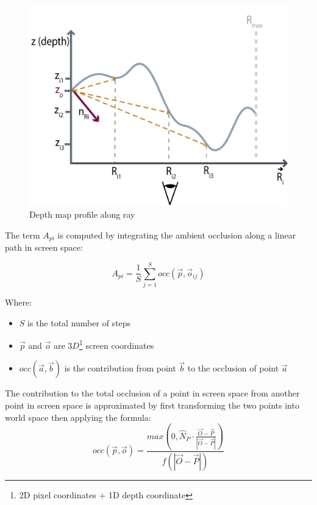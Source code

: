 \documentclass{article}
\begin{document}
\begin{figure}[!ht]
\caption{Depth map profile along ray}
\begin{center}
\includegraphics{images/SSAO-screenspace.png}
\end{center}
\label{ssaocreenspace}
\end{figure}

The term $A_{pi}$ is computed by integrating the ambient occlusion along a linear path
in screen space:

\begin{equation}
A_{pi} = \frac{1}{S}\sum_{j=1}^Socc(\vec{p},\vec{o}_{ij})
\label{ssaoray}
\end{equation}

Where:
\begin{itemize}
	\item $S$ is the total number of steps
	\item $\vec{p}$ and $\vec{o}$ are $3D$\footnote{ 2D pixel coordinates + 1D depth coordinate} screen coordinates
	\item $occ(\vec{a}, \vec{b})$ is the contribution from point $\vec{b}$ to the occlusion
	      of point $\vec{a}$ 
\end{itemize}

The contribution to the total occlusion of a point in screen space from another point in 
screen space is approximated by first transforming the two points into world space then applying the 
formula:
\begin{equation}
occ(\vec{p},\vec{o}) = \frac{max\left( 0, \hat{N}_{P} \cdot \frac{\vec{O}-\vec{P}}{\left|\vec{O} - \vec{P}\right|}\right)}
                            {f\left( \left|\vec{O} - \vec{P}\right|\right)}
\label{occ}
\end{equation}                                 
\end{document}
